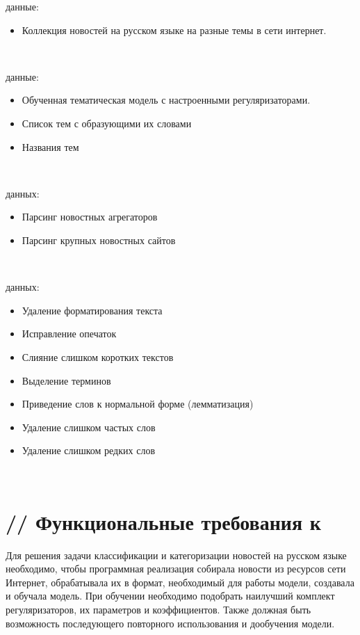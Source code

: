  данные:

\begin{itemize}
    \item Коллекция новостей на русском языке на разные темы в сети интернет.
\end{itemize}

~\

 данные:

\begin{itemize}
    \item Обученная тематическая модель с настроенными регуляризаторами.
    \item Список тем с образующими их словами
    \item \todo{}Названия тем
\end{itemize}

~\

 данных:

\begin{itemize}
    \item Парсинг новостных агрегаторов
    \item Парсинг крупных новостных сайтов
\end{itemize}

~\

 данных:

\begin{itemize}
    \item Удаление форматирования текста
    \item Исправление опечаток
    \item Слияние слишком коротких текстов
    \item Выделение терминов
    \item Приведение слов к нормальной форме (лемматизация)
    \item Удаление слишком частых слов
    \item Удаление слишком редких слов
\end{itemize}

~\



%
\section{// Функциональные требования к }

Для решения задачи классификации и категоризации новостей на русском языке необходимо, чтобы программная реализация собирала новости из ресурсов сети Интернет, обрабатывала их в формат, необходимый для работы модели, создавала и обучала модель. При обучении необходимо подобрать наилучший комплект регуляризаторов, их параметров и коэффициентов. Также должная быть возможность последующего повторного использования и дообучения модели. 
